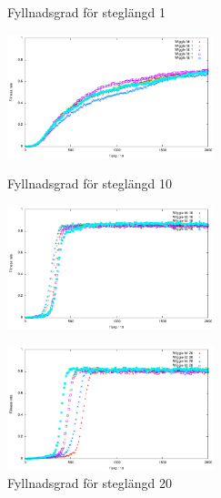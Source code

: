 \documentclass[titlepage, a4paper, 12pt]{article}
\begin{document}
\begin{figure}[H]
\begin{minipage}[b]{0.5\linewidth}
  \centering
  \caption{Fyllnadsgrad för steglängd 1}\label{fig:images/graphWiggle-1}
  \includegraphics[width=6cm]{images/graphWiggleTests-1.pdf}
\end{minipage}
\begin{minipage}[b]{0.5\linewidth}
  \centering
  \caption{Fyllnadsgrad för steglängd 10}\label{fig:images/graphWiggle-10}
  \includegraphics[width=6cm]{images/graphWiggleTests-10.pdf}
\end{minipage}

\hspace{0.5cm}

\begin{minipage}[b]{0.5\linewidth}
  \centering
  \caption{Fyllnadsgrad för steglängd 20}\label{fig:images/graphWiggle-20}
  \includegraphics[width=6cm]{images/graphWiggleTests-20.pdf}
\end{minipage}
\end{figure}
\end{document}

